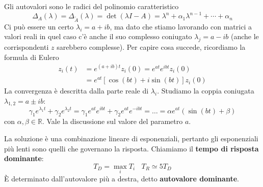 \documentclass[10pt,a4paper]{book}
\begin{document}
Gli autovalori sono le radici del polinomio caratteristico
\begin{equation*}
	\Delta _A\left(\lambda \right) =\Delta _{\tilde{A}}\left(\lambda \right) =\det\left(\lambda I-A\right) =\lambda ^n +\alpha _1 \lambda ^{n-1} +\cdots +\alpha _n
\end{equation*}
Ci può essere un certo $\lambda _i =a+ib$, ma dato che stiamo lavorando con matrici a valori reali in quel caso c'è anche il suo complesso coniugato $\lambda _j =a-ib$ (anche le corrispondenti $z$ sarebbero complesse). Per capire cosa succede, ricordiamo la formula di Eulero
\begin{equation*}
	\begin{aligned}
		z_i\left(t\right) & =e^{\left(a+ib\right) t} z_i\left(0\right) =e^{at} e^{ibt} z_i\left(0\right)    \\
		                   & =e^{at}\left[\cos\left(bt\right) +i\sin\left(bt\right)\right] z_i\left(0\right) 
	\end{aligned}
\end{equation*}
La convergenza è descritta dalla parte reale di $\lambda _i$. Studiamo la coppia coniugata $\lambda _{1,2} =a\pm ib$:
\begin{equation*}
	\gamma _1 e^{\lambda _1 t} +\gamma _2 e^{\lambda _2 t} =\gamma _1 e^{at} e^{ibt} +\gamma _2 e^{at} e^{-ibt} =\dotsc =\alpha e^{at}\left(\sin\left(bt\right) +\beta \right)
\end{equation*}
con $\alpha ,\beta \in \mathbb{R}$. Vale la discussione sul valore del parametro $a$.

La soluzione è una combinazione lineare di esponenziali, pertanto gli esponenziali più lenti sono quelli che governano la risposta. Chiamiamo il \textbf{tempo di risposta dominante}:
\begin{equation*}
	\boxed{T_D =\max_i T_i} \ \ \ \ \boxed{T_R \simeq 5T_D}
\end{equation*}
È determinato dall'autovalore più a destra, detto \textbf{autovalore dominante}.
\end{document}
